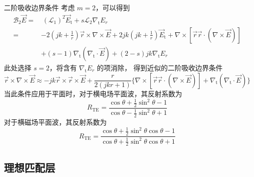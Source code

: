 \begin{theorem}{二阶吸收边界条件}
    考虑 $m=2$，可以得到
    \begin{equation}
        \begin{aligned}
            \mathcal{B}_2\vec{E}
            = &\ (\mathcal{L}_1)^2\vec{E}_{\text{t}}
            + s \mathcal{L}_2 \nabla_{\text{t}}E_r\\
            = &-2\left(
                jk+\frac{1}{r}
            \right)\vec{r}\times\nabla \times\vec{E}
            +2jk\left(
                jk+\frac{1}{r}
            \right)\vec{E}_{\text{t}}
            +\nabla\times\left[ 
                \vec{r}\vec{r}\cdot\left(\nabla\times\vec{E}\right)
                \right]\\
            &+(s-1)\nabla_{\text{t}}
            (\nabla_{\text{t}}\cdot \vec{E})
            +(2-s)jk\nabla_{\text{t}}E_r
        \end{aligned}
    \end{equation}
    此处选择 $s=2$，将含有 $\nabla_{\text{t}}E_r$ 的项消除，
    得到近似的二阶吸收边界条件
    \begin{equation}
        \vec{r}\times\nabla \times\vec{E}
        \approx
        -jk\vec{r}\times\vec{r}\times\vec{E}
        +\frac{r}{2(jkr+1)}
        \Bigg\{
            \nabla\times\left[
                \vec{r}\vec{r}\cdot\left(\nabla\times\vec{E}\right)
            \right]
            +\nabla_{\text{t}}
            \left(\nabla_{\text{t}}\cdot \vec{E}\right)
        \Bigg\}
    \end{equation}
    当此条件应用于平面时，对于横电场平面波，其反射系数为
    \begin{equation}
        R_{\text{TE}}
        =\frac{\cos \theta+\frac{1}{2}\sin^2 \theta-1}
        {\cos \theta-\frac{1}{2}\sin^2 \theta+1}
    \end{equation}
    对于横磁场平面波，其反射系数为
    \begin{equation}
        R_{\text{TE}}
        =\frac{\cos \theta+\frac{1}{2}\sin^2 \theta\cos \theta-1}
        {\cos \theta+\frac{1}{2}\sin^2 \theta\cos \theta+1}
    \end{equation}
\end{theorem}

\subsection{理想匹配层}